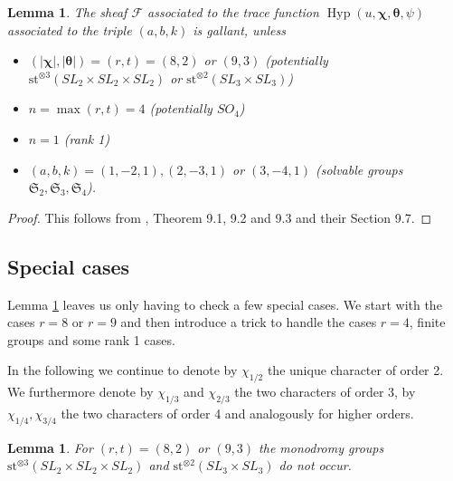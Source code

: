 \documentclass[12pt]{amsart}
\theoremstyle{plain}
\newtheorem{lem}[thm]{Lemma}
\theoremstyle{definition}
\theoremstyle{remark}
\numberwithin{equation}{section}
\DeclareMathOperator{\Hyp}{Hyp} %
\begin{document}
\begin{lem} \label{lem: gallant unles...}
    The sheaf $\mathcal{F}$ associated to the trace function $\Hyp(u,\bm\chi,\bm \theta,\psi)$ associated to the triple $(a,b,k)$ is gallant, unless \begin{itemize}
        \item $(|\bm \chi|,|\bm \theta |)=(r,t)=(8,2)$ or $(9,3)$ (potentially $ \mathrm{st}^{\otimes3}(SL_2\times SL_2\times SL_2)$ or $ \mathrm{st}^{\otimes2}(SL_3\times SL_3)$)
        \item $n=\max(r,t)=4$ (potentially $SO_4$)
        \item $n=1$ (rank 1)
        \item $(a,b,k)=(1,-2,1),(2,-3,1)$ or $(3,-4,1)$ (solvable groups $\mathfrak{S}_2,\mathfrak{S}_3, \mathfrak{S_4}$).
    \end{itemize}
\end{lem}
\begin{proof}
This follows from \cite{FKMSbilinear}, Theorem 9.1, 9.2 and 9.3 and their Section 9.7. 
\end{proof}


\subsection{Special cases}




Lemma \ref{lem: gallant unles...} leaves us only having to check a few special cases. We start with the cases $r=8$ or $r=9$ and then introduce a trick to handle the cases $r=4$, finite groups and some rank 1 cases.  

In the following we continue to denote by $\chi_{1/2}$ the unique character of order 2. We furthermore denote by $\chi_{1/3}$ and $\chi_{2/3}$ the two characters of order 3, by $\chi_{1/4},\chi_{3/4}$ the two characters of order 4 and analogously for higher orders. 


\begin{lem}
    For $(r,t)=(8,2)$ or $(9,3)$ the monodromy groups $\mathrm{st}^{\otimes3}(SL_2\times SL_2\times SL_2)$ and $ \mathrm{st}^{\otimes2}(SL_3\times SL_3)$ do not occur.
\end{lem}
\end{document}
